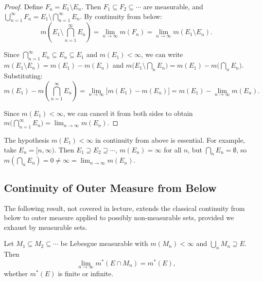 \documentclass[11pt]{report}
\begin{document}
\begin{proof}
Define $F_n = E_1 \setminus E_n$. Then $F_1 \subseteq F_2 \subseteq \cdots$ are measurable, and $\bigcup_{n=1}^{\infty} F_n = E_1 \setminus \bigcap_{n=1}^{\infty} E_n$. By continuity from below:
\[
m\left( E_1 \setminus \bigcap_{n=1}^{\infty} E_n \right) = \lim_{n \to \infty} m(F_n) = \lim_{n \to \infty} m(E_1 \setminus E_n).
\]

Since $\bigcap_{n=1}^{\infty} E_n \subseteq E_n \subseteq E_1$ and $m(E_1) < \infty$, we can write $m(E_1 \setminus E_n) = m(E_1) - m(E_n)$ and $m\bigl(E_1 \setminus \bigcap_n E_n\bigr) = m(E_1) - m\bigl(\bigcap_n E_n\bigr)$. Substituting:
\[
m(E_1) - m\left( \bigcap_{n=1}^{\infty} E_n \right) = \lim_{n \to \infty} \bigl[ m(E_1) - m(E_n) \bigr] = m(E_1) - \lim_{n \to \infty} m(E_n).
\]

Since $m(E_1) < \infty$, we can cancel it from both sides to obtain $m\bigl( \bigcap_{n=1}^{\infty} E_n \bigr) = \lim_{n \to \infty} m(E_n)$.
\end{proof}

\begin{rembox}
The hypothesis $m(E_1) < \infty$ in continuity from above is essential. For example, take $E_n = [n, \infty)$. Then $E_1 \supseteq E_2 \supseteq \cdots$, $m(E_n) = \infty$ for all $n$, but $\bigcap_n E_n = \emptyset$, so $m(\bigcap_n E_n) = 0 \neq \infty = \lim_{n \to \infty} m(E_n)$.
\end{rembox}

\subsection{Continuity of Outer Measure from Below}

The following result, not covered in lecture, extends the classical continuity from below to outer measure applied to possibly non-measurable sets, provided we exhaust by measurable sets.

\begin{thmbox}
Let $M_1 \subseteq M_2 \subseteq \cdots$ be Lebesgue measurable with $m(M_n) < \infty$ and $\bigcup_n M_n \supseteq E$. Then
\[
\lim_{n \to \infty} m^*(E \cap M_n) = m^*(E),
\]
whether $m^*(E)$ is finite or infinite.
\end{thmbox}
\end{document}
